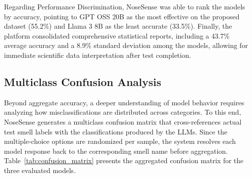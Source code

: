 \documentclass[sigconf]{acmart}
\begin{document}
Regarding Performance Discrimination, NoseSense was able to rank the models by accuracy, pointing to GPT OSS 20B as the most effective on the proposed dataset (55.2\%) and Llama 3 8B as the least accurate (33.5\%). Finally, the platform consolidated comprehensive statistical reports, including a 43.7\% average accuracy and a 8.9\% standard deviation among the models, allowing for immediate scientific data interpretation after test completion.

\subsection{Multiclass Confusion Analysis}
\label{subsec:confusion_analysis}

Beyond aggregate accuracy, a deeper understanding of model behavior requires analyzing how misclassifications are distributed across categories. To this end, NoseSense generates a multiclass confusion matrix that cross-references actual test smell labels with the classifications produced by the LLMs. Since the multiple-choice options are randomized per sample, the system resolves each model response back to the corresponding smell name before aggregation. Table~\ref{tab:confusion_matrix} presents the aggregated confusion matrix for the three evaluated models.
\end{document}
